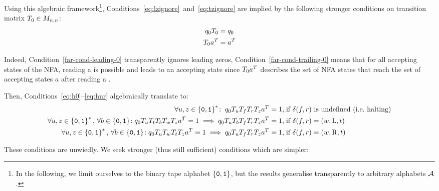 Using this algebraic framework\footnote{In the following, we limit ourselves to the binary tape alphabet $\left\{\texttt{0},\texttt{1}\right\}$, but the results generalise transparently to arbitrary alphabets $\mathcal{A}$.}, Conditions~\eqref{eq:lzignore}~and~\eqref{eq:tzignore} are implied by the following stronger conditions on transition matrix $T_0 \in M_{n,n}$:
\begin{align}
    q_0 T_0 & = q_0
    \label{far-cond-leading-0}
    \\
    T_0 a^{T} & = a^{T}
    \label{far-cond-trailing-0}
\end{align}

Indeed, Condition~\eqref{far-cond-leading-0} transparently ignores leading zeros, Condition~\eqref{far-cond-trailing-0} means that for all accepting states of the NFA, reading a \szero is possible and leads to an accepting state since $T_0 a^{T}$ describes the set of NFA states that reach the set of accepting states $a$ after reading a \szero.

Then, Conditions~\ref{eq:h0}--\eqref{eq:hnr} algebraically translate to:
{\small
\begin{align*}
    \forall u,z\in\left\{\texttt{0},\texttt{1}\right\}^*\!: \; q_0 T_u T_f T_r T_z a^{T} = 1, \;                                                                             & \text{if $\delta(f,r)$ is undefined (i.e.~halting)}
    \\
    \forall u,z\in\left\{\texttt{0},\texttt{1}\right\}^*,\,\forall b \in \left\{\texttt{0},\texttt{1}\right\}\!: q_0 T_{u} T_t T_b T_w T_{z} a^{T} = 1 \implies q_0 T_{u} T_b T_f T_r T_{z} a^{T} = 1,\; & \text{if $\delta(f,r) = (w,\text{L},t)$}
    \\
    \forall u,z\in\left\{\texttt{0},\texttt{1}\right\}^*,\,\forall b \in \left\{\texttt{0},\texttt{1}\right\}\!: q_0 T_{u} T_w T_t T_{z} a^{T} = 1 \implies q_0 T_{u} T_f T_r T_{z} a^{T} = 1,\;         & \text{if $\delta(f,r) = (w,\text{R},t)$}
\end{align*}
}

These conditions are unwiedly. We seek stronger (thus still sufficient) conditions which are simpler:

